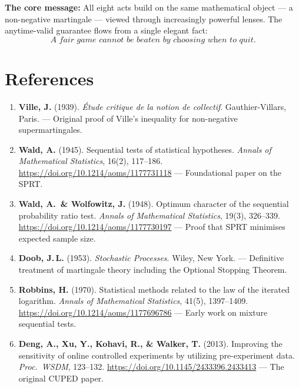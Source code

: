 \documentclass[12pt, a4paper]{article}
\begin{document}
\bigskip
\textbf{The core message:} All eight acts build on the same mathematical
object --- a non-negative martingale --- viewed through increasingly powerful
lenses.  The anytime-valid guarantee flows from a single elegant fact:
\[
  \textit{A fair game cannot be beaten by choosing when to quit.}
\]


\newpage
\section{References}
\label{sec:references}

\begin{enumerate}
  \item \textbf{Ville, J.} (1939).
        \textit{\'Etude critique de la notion de collectif}.
        Gauthier-Villars, Paris.
        --- Original proof of Ville's inequality for non-negative
        supermartingales.

  \item \textbf{Wald, A.} (1945).
        Sequential tests of statistical hypotheses.
        \textit{Annals of Mathematical Statistics}, 16(2), 117--186.
        \url{https://doi.org/10.1214/aoms/1177731118}
        --- Foundational paper on the SPRT.

  \item \textbf{Wald, A.\ \& Wolfowitz, J.} (1948).
        Optimum character of the sequential probability ratio test.
        \textit{Annals of Mathematical Statistics}, 19(3), 326--339.
        \url{https://doi.org/10.1214/aoms/1177730197}
        --- Proof that SPRT minimises expected sample size.

  \item \textbf{Doob, J.\,L.} (1953).
        \textit{Stochastic Processes}.
        Wiley, New York.
        --- Definitive treatment of martingale theory including the
        Optional Stopping Theorem.

  \item \textbf{Robbins, H.} (1970).
        Statistical methods related to the law of the iterated logarithm.
        \textit{Annals of Mathematical Statistics}, 41(5), 1397--1409.
        \url{https://doi.org/10.1214/aoms/1177696786}
        --- Early work on mixture sequential tests.

  \item \textbf{Deng, A., Xu, Y., Kohavi, R., \& Walker, T.} (2013).
        Improving the sensitivity of online controlled experiments by
        utilizing pre-experiment data.
        \textit{Proc.\ WSDM}, 123--132.
        \url{https://doi.org/10.1145/2433396.2433413}
        --- The original CUPED paper.


\end{enumerate}
\end{document}
